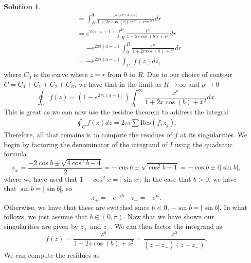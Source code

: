 \documentclass[12pt]{article}
\newcommand{\abs}[1]{ \left| #1 \right| }
\newcommand{\Res}{\text{Res}}
\theoremstyle{definition}
\newtheorem{sol}{Solution}
\theoremstyle{remark}
\begin{document}
\begin{sol}
\begin{align}
                           &= \int_{R}^{0} \frac{r^ae^{2\pi i (a+1)}}{1 + 2r\cos(b)e^{2\pi i} + r^2e^{4\pi i}} dr\\
                           &= e^{2\pi i (a+1)}\int_{R}^{0} \frac{r^a}{1 + 2r\cos(b) + r^2}dr\\
                           &= -e^{2\pi i (a+1)} \int_{0}^{R} \frac{r^a}{1 + 2r\cos(b) + r^2}dr\\
                           &= -e^{2\pi i(a+1)} \int_{C_0} f(z) dz,
    \end{align}
    where $C_0$ is the curve where $z = r$ from $0$ to $R$. Due to our choice of contour $C = C_0 + C_1 + C_2 + C_R$, we have that in the limit as $R\to\infty$ and $\rho\to0$
    \begin{equation}
        \oint_C f(z) = (1- e^{2\pi i (a+1)}) \int_{0}^{\infty} \frac{x^a}{1 + 2x\cos(b) + x^2}dx.
    \end{equation}
    This is great as we can now use the residue theorem to address the integral 
    \begin{align}
        \oint_C f(z)dz = 2\pi i \sum \Res(f, z_j).
    \end{align}
    Therefore, all that remains is to compute the residues of $f$ at its singularities. We begin by factoring the denominator of the integrand of $I$ using the quadratic formula
    \begin{equation}
        z_{\pm} = \frac{-2\cos b \pm \sqrt{ 4\cos^2 b - 4 }}{2} = -\cos b \pm \sqrt{\cos^2 b - 1} = -\cos b \pm i \abs{\sin b},
    \end{equation}
    where we have used that $1 - \cos^2 x = \abs{\sin x}$. In the case that $b > 0$, we have that $\sin b = \abs{\sin b}$, so
    \begin{equation}
        z_{+} = - e^{-ib} \quad z_{-} = -e^{ib}.
    \end{equation}
    Otherwise, we have that these are switched since $b<0$, $-\sin b = \abs{\sin b}$. In what follows, we just assume that $b\in(0,\pi)$. Now that we have shown our singularities are given by $z_+$ and $z_-$. We can then factor the integrand as 
    \begin{equation}
        f(z) =  \frac{z^a}{1 + 2z\cos(b) + z^2} = \frac{z^a}{(z-z_+)(z-z_-)}.
    \end{equation}
    We can compute the residues as 


\end{sol}
\end{document}
